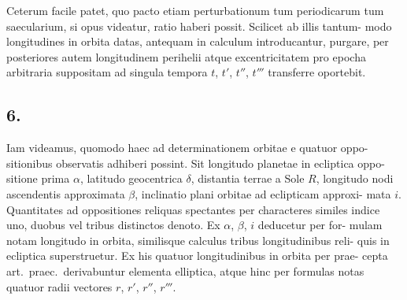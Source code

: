 \documentclass[12pt,a4paper]{article}
\begin{document}
Ceterum facile patet, quo pacto etiam perturbationum tum periodicarum
tum saecularium, si opus videatur, ratio haberi possit. Scilicet ab illis tantum-
modo longitudines in orbita datas, antequam in calculum introducantur, purgare,
per posteriores autem longitudinem perihelii atque excentricitatem pro epocha
arbitraria suppositam ad singula tempora $t$, $t'$, $t''$, $t'''$ transferre oportebit.

\subsection*{6.}

Iam videamus, quomodo haec ad determinationem orbitae e quatuor oppo-
sitionibus observatis adhiberi possint. Sit longitudo planetae in ecliptica oppo-
sitione prima $\alpha$, latitudo geocentrica $\delta$, distantia terrae a Sole $R$, longitudo
nodi ascendentis approximata $\beta$, inclinatio plani orbitae ad eclipticam approxi-
mata $i$. Quantitates ad oppositiones reliquas spectantes per characteres similes
indice uno, duobus vel tribus distinctos denoto. Ex $\alpha$, $\beta$, $i$ deducetur per for-
mulam notam longitudo in orbita, similisque calculus tribus longitudinibus reli-
quis in ecliptica superstruetur. Ex his quatuor longitudinibus in orbita per prae-
cepta art.\ praec.\ derivabuntur elementa elliptica, atque hinc per formulas notas
quatuor radii vectores $r$, $r'$, $r''$, $r'''$.
\end{document}
